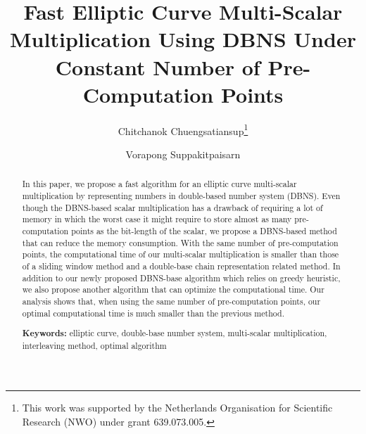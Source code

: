 \documentclass[a4paper,11pt,runningheads]{llncs}
\begin{document}
\title{Fast Elliptic Curve Multi-Scalar Multiplication Using DBNS Under Constant Number of Pre-Computation Points}

\author{
Chitchanok Chuengsatiansup\thanks{This work was supported by the Netherlands Organisation for Scientific Research (NWO) under grant 639.073.005.}
\and
Vorapong Suppakitpaisarn
}


\maketitle

\begin{abstract}
In this paper, we propose a fast algorithm for an elliptic curve multi-scalar multiplication by representing numbers in double-based number system (DBNS).
Even though the DBNS-based scalar multiplication has a drawback of requiring a lot of memory
in which the worst case it might require to store almost as many pre-computation points as the bit-length of the scalar,
we propose a DBNS-based method that can reduce the memory consumption.
With the same number of pre-computation points, the computational time of our multi-scalar multiplication is smaller than
those of a sliding window method and a double-base chain representation related method.
In addition to our newly proposed DBNS-base algorithm which relies on greedy heuristic,
we also propose another algorithm that can optimize the computational time.
Our analysis shows that, when using the same number of pre-computation points, our optimal computational time is much smaller than the previous method. 

\smallskip
\textbf{Keywords:} 
elliptic curve, double-base number system, multi-scalar multiplication, interleaving method, optimal algorithm
\end{abstract}






\clearpage


\end{document}
